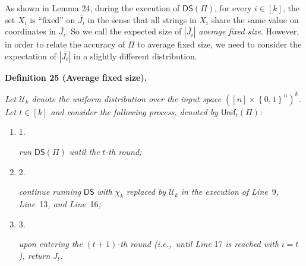 \documentclass[10pt,a4paper]{article}
\begin{document}
As shown in Lemma 24, during the execution of $\mathsf{DS}(\Pi)$, for every $i\in[k]$, the set $X_{i}$ is “fixed” on $\overline{J_{i}}$ in the sense that all strings in $X_{i}$ share the same value on coordinates in $\overline{J_{i}}$. So we call the expected size of $|\overline{J_{i}}|$ \emph{average fixed size}. However, in order to relate the accuracy of $\Pi$ to average fixed size, we need to consider the expectation of $|\overline{J_{i}}|$ in a slightly different distribution.\par





\par\medskip\noindent\textbf{
\textbf{Definition 25}\textbf{ }(Average fixed size)\textbf{.}
}\par



\emph{Let $\mathcal{U}_{k}$ denote the uniform distribution over the input space $([n]\times\left\{0,1\right\}^{n})^{k}$.
Let $t\in[k]$ and consider the following process, denoted by $\mathsf{Unif}_{t}(\Pi)$:}\par


\begin{enumerate}


\item[] 
1. 


\emph{run }$\mathsf{DS}(\Pi)$\emph{ until the }$t$\emph{-th round;}\par





\item[] 
2. 


\emph{continue running }$\mathsf{DS}$\emph{ with }$\chi_{k}$\emph{ replaced by }$\mathcal{U}_{k}$\emph{ in the execution of Line }9\emph{, Line }13\emph{, and Line }16\emph{;}\par





\item[] 
3. 


\emph{upon entering the }$(t+1)$\emph{-th round (i.e., until Line }17\emph{ is reached with }$i=t$\emph{), return }$J_{t}$\emph{.}\par





\end{enumerate}
\end{document}
